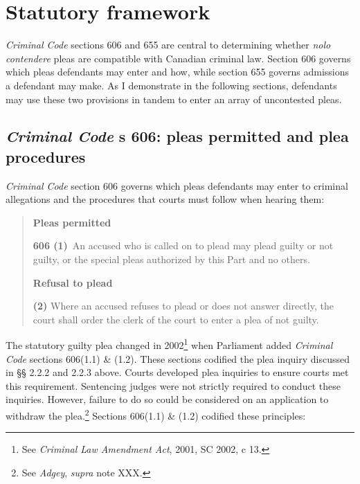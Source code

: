 \section{Statutory framework}

\textit{Criminal Code} sections 606 and 655 are central to determining whether \textit{nolo contendere} pleas are compatible with Canadian criminal law. Section 606 governs which pleas defendants may enter and how, while section 655 governs admissions a defendant may make. As I demonstrate in the following sections, defendants may use these two provisions in tandem to enter an array of uncontested pleas.

\subsection{\textit{Criminal Code} s 606: pleas permitted and plea procedures}

\textit{Criminal Code} section 606 governs which pleas defendants may enter to criminal allegations and the procedures that courts must follow when hearing them:

\begin{quote}
    \onehalfspacing
    \textbf{Pleas permitted}
    
    \textbf{606 (1)} An accused who is called on to plead may plead guilty or not guilty, or the special pleas authorized by this Part and no others.\medskip

    \textbf{Refusal to plead}
    
    \textbf{(2)} Where an accused refuses to plead or does not answer directly, the court shall order the clerk of the court to enter a plea of not guilty.
    
\end{quote}

The statutory guilty plea changed in 2002\footnote{See \textit{Criminal Law Amendment Act}, 2001, SC 2002, c 13.} when Parliament added \textit{Criminal Code} sections 606(1.1) \& (1.2). These sections codified the plea inquiry discussed in §§ 2.2.2 and 2.2.3 above. Courts developed plea inquiries to ensure courts met this requirement. Sentencing judges were not strictly required to conduct these inquiries. However, failure to do so could be considered on an application to withdraw the plea.\footnote{See \textit{Adgey}, \textit{supra} note XXX.} Sections 606(1.1) \& (1.2) codified these principles:

